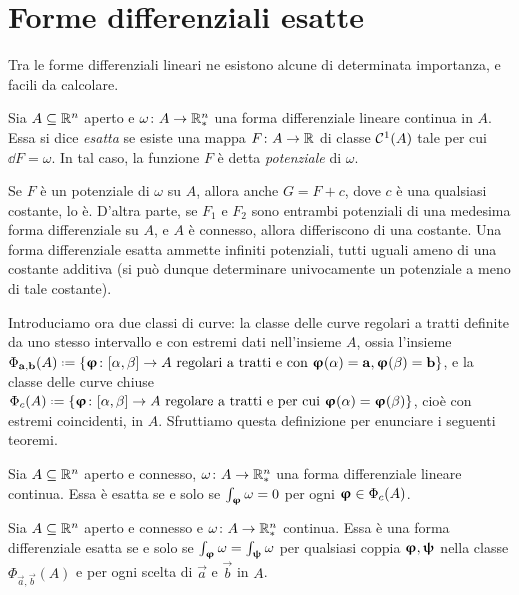 \section{Forme differenziali esatte}
Tra le forme differenziali lineari ne esistono alcune di determinata importanza, e facili da calcolare.
\begin{definizione} \label{d:forma-diff-esatta}
	Sia $A\subseteq\mathbb{R}^n$ aperto e $\omega\colon A\to\mathbb{R}^n_*$ una forma differenziale lineare continua in $A$.
	Essa si dice \emph{esatta} se esiste una mappa $F\colon A\to\mathbb{R}$ di classe $\mathcal{C}^{{1}}(A)$ tale per cui $\dd F=\omega$.
	In tal caso, la funzione $F$ è detta \emph{potenziale} di $\omega$.
\end{definizione}
\begin{osservazione}
	Se $F$ è un potenziale di $\omega$ su $A$, allora anche $G=F+c$, dove $c$ è una qualsiasi costante, lo è.
	D'altra parte, se $F_1$ e $F_2$ sono entrambi potenziali di una medesima forma differenziale su $A$, e $A$ è connesso, allora differiscono di una costante.%
	Una forma differenziale esatta ammette infiniti potenziali, tutti uguali ameno di una costante additiva (si può dunque determinare univocamente un potenziale a meno di tale costante).
\end{osservazione}
Introduciamo ora due classi di curve: la classe delle curve regolari a tratti definite da uno stesso intervallo e con estremi dati nell'insieme $A$, ossia l'insieme $\Phi_{\vec a,\vec b}(A)\defeq\{\vphi\colon[\alpha,\beta]\to A\text{ regolari a tratti e con }\vphi(\alpha)=\vec a, \vphi(\beta)=\vec b\}$, e la classe delle curve chiuse $\Phi_c(A)\defeq\{\vphi\colon[\alpha,\beta]\to A\text{ regolare a tratti e per cui }\vphi(\alpha)=\vphi(\beta)\}$, cioè con estremi coincidenti, in $A$.
Sfruttiamo questa definizione per enunciare i seguenti teoremi.
\begin{teorema}
	Sia $A\subseteq\mathbb{R}^n$ aperto e connesso, $\omega\colon A\to\mathbb{R}^n_*$ una forma differenziale lineare continua.
	Essa è esatta se e solo se $\int_{\bm{\upvarphi}}\omega=0$ per ogni $\bm{\upvarphi}\in\Phi_c(A)$.
\end{teorema}
\begin{teorema}
	Sia $A\subseteq\mathbb{R}^n$ aperto e connesso e $\omega\colon A\to\mathbb{R}^n_*$ continua.
	Essa è una forma differenziale esatta se e solo se $\int_{\bm{\upvarphi}}\omega=\int_{\bm{\uppsi}}\omega$ per qualsiasi coppia $\bm{\upvarphi},\bm{\uppsi}$ nella classe $\Phi_{\vec a,\vec b}(A)$ e per ogni scelta di $\vec a$ e $\vec b$ in $A$.
\end{teorema}
